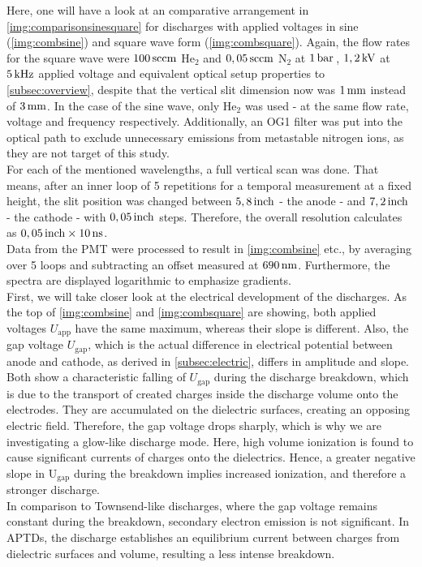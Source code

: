\documentclass[a4paper,10pt,twoside]{article}
\newcommand{\ix}[1]{_\text{#1}}
\begin{document}
			\begin{multicols*}{2}
				Here, one will have a look at an comparative arrangement in \autoref{img:comparisonsinesquare} for discharges with applied voltages in sine (\autoref{img:combsine}) and square wave form (\autoref{img:combsquare}). Again, the flow rates for the square wave were $\unit[100]{sccm}$ He$_2$ and $\unit[0,05]{sccm}$ N$_2$ at $\unit[1]{bar}$\,, $\unit[1,2]{kV}$ at $\unit[5]{kHz}$ applied voltage and equivalent optical setup properties to \autoref{subsec:overview}, despite that the vertical slit dimension now was $\unit[1]{mm}$ instead of $\unit[3]{mm}$. In the case of the sine wave,	only He$_2$ was used - at the same flow rate, voltage and frequency respectively. Additionally, an OG1 filter was put into the optical path to exclude unnecessary emissions from metastable nitrogen ions, as they are not target of this study.\\
				For each of the mentioned wavelengths, a full vertical scan was done. That means, after an inner loop of 5 repetitions for a temporal measurement at a fixed height, the slit position was changed between $\unit[5,8]{inch}$ - the anode - and $\unit[7,2]{inch}$ - the cathode - with $\unit[0,05]{inch}$ steps. Therefore, the overall resolution calculates as $\unit[0,05]{inch}\times\unit[10]{ns}$.\\
				Data from the PMT were processed to result in \autoref{img:combsine} etc., by averaging over 5 loops and subtracting an offset measured at $\unit[690]{nm}$. Furthermore, the spectra are displayed logarithmic to emphasize gradients.\\
				First, we will take closer look at the electrical development of the discharges. As the top of \autoref{img:combsine} and \autoref{img:combsquare} are showing, both applied voltages $U\ix{app}$ have the same maximum, whereas their slope is different. Also, the gap voltage $U\ix{gap}$, which is the actual difference in electrical potential between anode and cathode, as derived in \autoref{subsec:electric}, differs in amplitude and slope. Both show a characteristic falling of $U\ix{gap}$ during the discharge breakdown, which is due to the transport of created charges inside the discharge volume onto the electrodes. They are accumulated on the dielectric surfaces, creating an opposing electric field. Therefore, the gap voltage drops sharply, which is why we are investigating a glow-like discharge mode. Here, high volume ionization is found to cause significant currents of charges onto the dielectrics. Hence, a greater negative slope in U$\ix{gap}$ during the breakdown implies increased ionization, and therefore a stronger discharge.\\
				In comparison to Townsend-like discharges, where the gap voltage remains constant during the breakdown, secondary electron emission is not significant. In APTDs, the discharge establishes an equilibrium current between charges from dielectric surfaces and volume, resulting a less intense breakdown.\\
			\end{multicols*}
				
\end{document}
